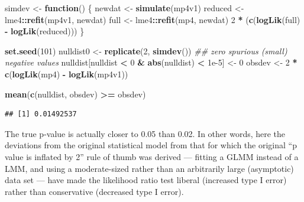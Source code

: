 \documentclass[
  12pt,
]{book}
\newenvironment{Shaded}{\begin{snugshade}}{\end{snugshade}}
\newcommand{\CommentTok}[1]{\textcolor[rgb]{0.56,0.35,0.01}{\textit{#1}}}
\newcommand{\ControlFlowTok}[1]{\textcolor[rgb]{0.13,0.29,0.53}{\textbf{#1}}}
\newcommand{\DecValTok}[1]{\textcolor[rgb]{0.00,0.00,0.81}{#1}}
\newcommand{\FloatTok}[1]{\textcolor[rgb]{0.00,0.00,0.81}{#1}}
\newcommand{\KeywordTok}[1]{\textcolor[rgb]{0.13,0.29,0.53}{\textbf{#1}}}
\newcommand{\NormalTok}[1]{#1}
\newcommand{\OperatorTok}[1]{\textcolor[rgb]{0.81,0.36,0.00}{\textbf{#1}}}
\newcommand{\StringTok}[1]{\textcolor[rgb]{0.31,0.60,0.02}{#1}}
\begin{document}
\begin{Shaded}
\begin{Highlighting}[]
\NormalTok{simdev \textless{}{-}}\StringTok{ }\ControlFlowTok{function}\NormalTok{() \{}
\NormalTok{  newdat \textless{}{-}}\StringTok{ }\KeywordTok{simulate}\NormalTok{(mp4v1)}
\NormalTok{  reduced \textless{}{-}}\StringTok{ }\NormalTok{lme4}\OperatorTok{::}\KeywordTok{refit}\NormalTok{(mp4v1, newdat)}
\NormalTok{  full \textless{}{-}}\StringTok{ }\NormalTok{lme4}\OperatorTok{::}\KeywordTok{refit}\NormalTok{(mp4, newdat)}
  \DecValTok{2} \OperatorTok{*}\StringTok{ }\NormalTok{(}\KeywordTok{c}\NormalTok{(}\KeywordTok{logLik}\NormalTok{(full) }\OperatorTok{{-}}\StringTok{ }\KeywordTok{logLik}\NormalTok{(reduced)))}
\NormalTok{\}}

\KeywordTok{set.seed}\NormalTok{(}\DecValTok{101}\NormalTok{)}
\NormalTok{nulldist0 \textless{}{-}}\StringTok{ }\KeywordTok{replicate}\NormalTok{(}\DecValTok{2}\NormalTok{, }\KeywordTok{simdev}\NormalTok{())}
\CommentTok{\#\# zero spurious (small) negative values}
\NormalTok{nulldist[nulldist }\OperatorTok{\textless{}}\StringTok{ }\DecValTok{0} \OperatorTok{\&}\StringTok{ }\KeywordTok{abs}\NormalTok{(nulldist) }\OperatorTok{\textless{}}\StringTok{ }\FloatTok{1e{-}5}\NormalTok{] \textless{}{-}}\StringTok{ }\DecValTok{0}
\NormalTok{obsdev \textless{}{-}}\StringTok{ }\DecValTok{2} \OperatorTok{*}\StringTok{ }\KeywordTok{c}\NormalTok{(}\KeywordTok{logLik}\NormalTok{(mp4) }\OperatorTok{{-}}\StringTok{ }\KeywordTok{logLik}\NormalTok{(mp4v1))}
\end{Highlighting}
\end{Shaded}

\begin{Shaded}
\begin{Highlighting}[]
\KeywordTok{mean}\NormalTok{(}\KeywordTok{c}\NormalTok{(nulldist, obsdev) }\OperatorTok{\textgreater{}=}\StringTok{ }\NormalTok{obsdev)}
\end{Highlighting}
\end{Shaded}

\begin{verbatim}
## [1] 0.01492537
\end{verbatim}

The true p-value is actually closer to 0.05 than 0.02. In other words, here the deviations from the original statistical model from that for which the original ``p value is inflated by 2'' rule of thumb was derived --- fitting a GLMM instead of a LMM, and using a moderate-sized rather than an arbitrarily large (asymptotic) data set --- have made the likelihood ratio test liberal (increased type I error) rather than conservative (decreased type I error).
\end{document}
